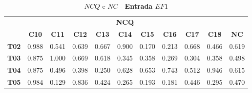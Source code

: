 \begin{table}[htbp]
	\centering
	\caption{$NCQ$ e $NC$ - \textbf{Entrada $EF1$}}
	\begin{tabular}{|c|ccccccccc|c|}
		\hline
		\rowcolor[HTML]{D0CECE} 
		\cellcolor[HTML]{D0CECE} & \multicolumn{9}{c|}{\cellcolor[HTML]{D0CECE}\textbf{NCQ}} & \cellcolor[HTML]{D0CECE} \\ \cline{2-10}
		\rowcolor[HTML]{D0CECE} 
		\multirow{-2}{*}{\cellcolor[HTML]{D0CECE}\textbf{Part.}} & \multicolumn{1}{c|}{\cellcolor[HTML]{D0CECE}\textbf{C10}} & \multicolumn{1}{c|}{\cellcolor[HTML]{D0CECE}\textbf{C11}} & \multicolumn{1}{c|}{\cellcolor[HTML]{D0CECE}\textbf{C12}} & \multicolumn{1}{c|}{\cellcolor[HTML]{D0CECE}\textbf{C13}} & \multicolumn{1}{c|}{\cellcolor[HTML]{D0CECE}\textbf{C14}} & \multicolumn{1}{c|}{\cellcolor[HTML]{D0CECE}\textbf{C15}} & \multicolumn{1}{c|}{\cellcolor[HTML]{D0CECE}\textbf{C16}} & \multicolumn{1}{c|}{\cellcolor[HTML]{D0CECE}\textbf{C17}} & \textbf{C18} & \multirow{-2}{*}{\cellcolor[HTML]{D0CECE}\textbf{NC}} \\ \hline
		\textbf{T02} & \multicolumn{1}{c|}{0.988} & \multicolumn{1}{c|}{0.541} & \multicolumn{1}{c|}{0.639} & \multicolumn{1}{c|}{0.667} & \multicolumn{1}{c|}{0.900} & \multicolumn{1}{c|}{0.170} & \multicolumn{1}{c|}{0.213} & \multicolumn{1}{c|}{0.668} & 0.466 & 0.619 \\ \hline
		\rowcolor[HTML]{F2F2F2} 
		\textbf{T03} & \multicolumn{1}{c|}{\cellcolor[HTML]{F2F2F2}0.875} & \multicolumn{1}{c|}{\cellcolor[HTML]{F2F2F2}1.000} & \multicolumn{1}{c|}{\cellcolor[HTML]{F2F2F2}0.669} & \multicolumn{1}{c|}{\cellcolor[HTML]{F2F2F2}0.618} & \multicolumn{1}{c|}{\cellcolor[HTML]{F2F2F2}0.345} & \multicolumn{1}{c|}{\cellcolor[HTML]{F2F2F2}0.358} & \multicolumn{1}{c|}{\cellcolor[HTML]{F2F2F2}0.269} & \multicolumn{1}{c|}{\cellcolor[HTML]{F2F2F2}0.304} & 0.358 & 0.498 \\ \hline
		\textbf{T04} & \multicolumn{1}{c|}{0.875} & \multicolumn{1}{c|}{0.496} & \multicolumn{1}{c|}{0.398} & \multicolumn{1}{c|}{0.250} & \multicolumn{1}{c|}{0.628} & \multicolumn{1}{c|}{0.653} & \multicolumn{1}{c|}{0.743} & \multicolumn{1}{c|}{0.512} & 0.946 & 0.615 \\ \hline
		\rowcolor[HTML]{F2F2F2} 
		\textbf{T05} & \multicolumn{1}{c|}{\cellcolor[HTML]{F2F2F2}0.984} & \multicolumn{1}{c|}{\cellcolor[HTML]{F2F2F2}0.129} & \multicolumn{1}{c|}{\cellcolor[HTML]{F2F2F2}0.836} & \multicolumn{1}{c|}{\cellcolor[HTML]{F2F2F2}0.424} & \multicolumn{1}{c|}{\cellcolor[HTML]{F2F2F2}0.265} & \multicolumn{1}{c|}{\cellcolor[HTML]{F2F2F2}0.193} & \multicolumn{1}{c|}{\cellcolor[HTML]{F2F2F2}0.181} & \multicolumn{1}{c|}{\cellcolor[HTML]{F2F2F2}0.446} & 0.295 & 0.470 \\ \hline

\end{tabular}
\end{table}
